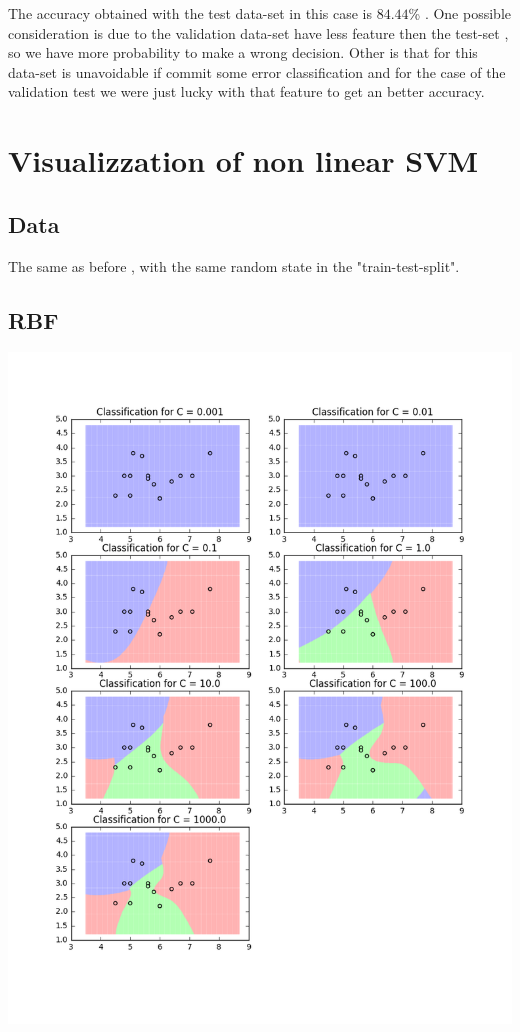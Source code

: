 \documentclass[11pt]{article}
\theoremstyle{plain}
\begin{document}
The accuracy obtained with the test data-set in this case is $84.44$\% . One possible consideration is due to the validation data-set have less feature then the test-set , so we have more probability to make a wrong decision. Other is  that for this data-set is unavoidable if commit some error classification and for the case of the validation test we were just lucky with that feature to get an better accuracy.

\newpage

\section{Visualizzation of non linear SVM}
\subsection*{Data}

The same as before , with the same random state in the "train-test-split".

\subsection*{RBF}

\begin{center}
\includegraphics[scale=0.5]{3}
\end{center}
\end{document}
